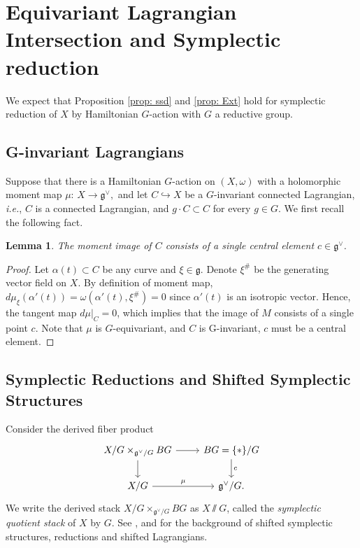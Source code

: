 \documentclass[12pt]{amsart}
\newtheorem{lemma}[theorem]{Lemma}
\theoremstyle{definition}
\theoremstyle{remark}
\numberwithin{equation}{section}
\begin{document}
\section{Equivariant Lagrangian Intersection and Symplectic reduction}\label{sec:eqsym}
We expect that Proposition \ref{prop: ssd} and \ref{prop: Ext} hold for symplectic reduction of $X$ by Hamiltonian $G$-action with $G$ a reductive group. 
\subsection{G-invariant Lagrangians}
Suppose that there is a Hamiltonian $G$-action on $(X, \omega)$ with a holomorphic moment map
$\mu:\, X\longrightarrow \mathfrak{g}^{\vee},$ and let $C\hookrightarrow X$ be a $G$-invariant connected Lagrangian, \emph{i.e.}, $C$ is a connected Lagrangian, and $g\cdot C\subset C$ for every $g\in G$.
We first recall the following fact. 
\begin{lemma}\label{lem: invLag}
  The moment image of $C$ consists of a single central element $c\in \mathfrak{g}^{\vee}$.
\end{lemma}
\begin{proof}
    Let  $\alpha(t)\subset C$ be any curve and $\xi\in \mathfrak{g}$. Denote $\xi^{\#}$ be the generating vector field on $X$. By definition of moment map, $d\mu_{\xi}(\alpha'(t))=\omega(\alpha'(t), \xi^{\#})=0$ since $\alpha'(t)$ is an isotropic vector. Hence, the tangent map $d\mu|_C=0$, which implies that the image of $M$ consists of a single point $c$. Note that $\mu$ is $G$-equivariant, and $C$ is G-invariant, $c$ must  be a central element. 
\end{proof}

\subsection{Symplectic Reductions and Shifted Symplectic Structures} Consider the derived fiber product
 \begin{equation*}
\begin{tikzcd}
X/G\times_{\mathfrak{g}^{\vee}/G} BG \arrow[r] \arrow[d]
& BG=\{*\}/G \arrow[d, "c"] \\
 X/G\arrow[r, "\mu"] & \mathfrak{g}^{\vee}/G.
\end{tikzcd}
 \end{equation*}
We write the derived stack $X/G\times_{\mathfrak{g}^{\vee}/G} BG$ as $X\sslash  G$, called the \emph{symplectic quotient stack} of $X$ by $G$. See \cite{pantev2013shifted}, \cite{anel2022shifted} and \cite{park2025introduction} for the background of shifted symplectic structures, reductions and shifted Lagrangians. 
\end{document}
